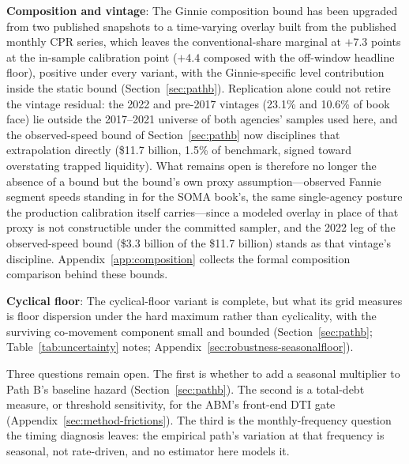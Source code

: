\textbf{Composition and vintage}: The Ginnie composition bound has been upgraded from two published snapshots to a time-varying overlay built from the published monthly CPR series, which leaves the conventional-share marginal at $+7.3$ points at the in-sample calibration point ($+4.4$ composed with the off-window headline floor), positive under every variant, with the Ginnie-specific level contribution inside the static bound (Section~\ref{sec:pathb}). Replication alone could not retire the vintage residual: the 2022 and pre-2017 vintages (23.1\% and 10.6\% of book face) lie outside the 2017--2021 universe of both agencies' samples used here, and the observed-speed bound of Section~\ref{sec:pathb} now disciplines that extrapolation directly (\$11.7 billion, 1.5\% of benchmark, signed toward overstating trapped liquidity). What remains open is therefore no longer the absence of a bound but the bound's own proxy assumption---observed Fannie segment speeds standing in for the SOMA book's, the same single-agency posture the production calibration itself carries---since a modeled overlay in place of that proxy is not constructible under the committed sampler, and the 2022 leg of the observed-speed bound (\$3.3 billion of the \$11.7 billion) stands as that vintage's discipline. Appendix~\ref{app:composition} collects the formal composition comparison behind these bounds.

\textbf{Cyclical floor}: The cyclical-floor variant is complete, but what its grid measures is floor dispersion under the hard maximum rather than cyclicality, with the surviving co-movement component small and bounded (Section~\ref{sec:pathb}; Table~\ref{tab:uncertainty} notes; Appendix~\ref{sec:robustness-seasonalfloor}).

Three questions remain open. The first is whether to add a seasonal multiplier to Path B's baseline hazard (Section~\ref{sec:pathb}). The second is a total-debt measure, or threshold sensitivity, for the ABM's front-end DTI gate (Appendix~\ref{sec:method-frictions}). The third is the monthly-frequency question the timing diagnosis leaves: the empirical path's variation at that frequency is seasonal, not rate-driven, and no estimator here models it.

\clearpage



\clearpage

